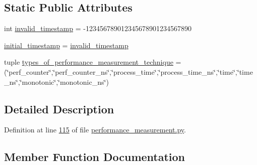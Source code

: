 \subsection*{Static Public Attributes}
\begin{DoxyCompactItemize}
\item 
int \hyperlink{classutilities_1_1timing__measurements_1_1performance__measurement_1_1execution__time__measurement_a3d083e8440c081f0a39ecea850d3cb67}{invalid\+\_\+timestamp} = -\/123456789012345678901234567890
\item 
\hyperlink{classutilities_1_1timing__measurements_1_1performance__measurement_1_1execution__time__measurement_ac60d39fb6affbaa3d6eb2792c41ee7ff}{initial\+\_\+timestamp} = \hyperlink{classutilities_1_1timing__measurements_1_1performance__measurement_1_1execution__time__measurement_a3d083e8440c081f0a39ecea850d3cb67}{invalid\+\_\+timestamp}
\item 
tuple \hyperlink{classutilities_1_1timing__measurements_1_1performance__measurement_1_1execution__time__measurement_a80ff3ce9b405f5d8c2e63294348ca6dc}{types\+\_\+of\+\_\+performance\+\_\+measurement\+\_\+technique} = (\char`\"{}perf\+\_\+counter\char`\"{},\char`\"{}perf\+\_\+counter\+\_\+ns\char`\"{},\char`\"{}process\+\_\+time\char`\"{},\char`\"{}process\+\_\+time\+\_\+ns\char`\"{},\char`\"{}time\char`\"{},\char`\"{}time\+\_\+ns\char`\"{},\char`\"{}monotonic\char`\"{},\char`\"{}monotonic\+\_\+ns\char`\"{})
\end{DoxyCompactItemize}


\subsection{Detailed Description}


Definition at line \hyperlink{performance__measurement_8py_source_l00115}{115} of file \hyperlink{performance__measurement_8py_source}{performance\+\_\+measurement.\+py}.



\subsection{Member Function Documentation}
\hypertarget{classutilities_1_1timing__measurements_1_1performance__measurement_1_1execution__time__measurement_a9b05f1fd5acd56880daa42266dbf8284}{}
